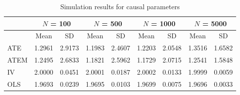 \documentclass[12pt]{article}\usepackage[]{graphicx}\usepackage[]{xcolor}
\begin{document}
\begin{longtable}{lcccccccc}
\caption{Simulation results for causal parameters} \\ 
  \toprule & \multicolumn{2}{c}{$N$ = 100} & \multicolumn{2}{c}{$N$ = 500} & \multicolumn{2}{c}{$N$ = 1000} &  \multicolumn{2}{c}{$N$ = 5000} \\
 \toprule
 & Mean & SD & Mean & SD & Mean & SD & Mean & SD \\ 
  \midrule
ATE & 1.2961 & 2.9173 & 1.1983 & 2.4607 & 1.2203 & 2.0548 & 1.3516 & 1.6582 \\ 
  ATEM & 1.2495 & 2.6833 & 1.1821 & 2.5962 & 1.1729 & 2.0715 & 1.2541 & 1.5848 \\ 
  IV & 2.0000 & 0.0451 & 2.0001 & 0.0187 & 2.0002 & 0.0133 & 1.9999 & 0.0059 \\ 
  OLS & 1.9693 & 0.0239 & 1.9695 & 0.0103 & 1.9699 & 0.0075 & 1.9696 & 0.0033 \\ 
   \bottomrule
\end{longtable}
\end{document}
